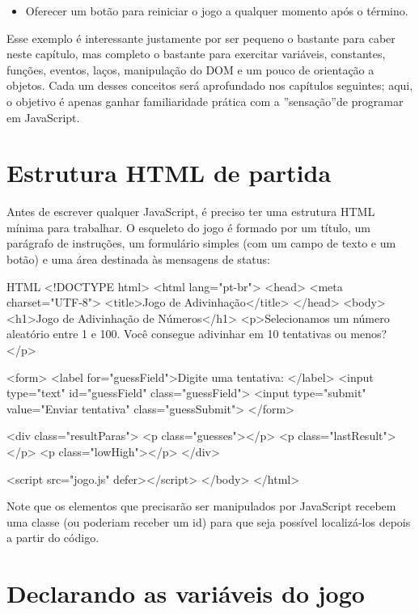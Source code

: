 \begin{itemize}
  \item Oferecer um botão para reiniciar o jogo a qualquer momento após o término.
\end{itemize}

Esse exemplo é interessante justamente por ser pequeno o bastante para caber neste capítulo, mas completo o bastante para exercitar variáveis, constantes, funções, eventos, laços, manipulação do DOM e um pouco de orientação a objetos. Cada um desses conceitos será aprofundado nos capítulos seguintes; aqui, o objetivo é apenas ganhar familiaridade prática com a ”sensação”de programar em JavaScript.

\section{Estrutura HTML de partida}

Antes de escrever qualquer JavaScript, é preciso ter uma estrutura HTML mínima para trabalhar. O esqueleto do jogo é formado por um título, um parágrafo de instruções, um formulário simples (com um campo de texto e um botão) e uma área destinada às mensagens de status:

\begin{codebox}{HTML}
<!DOCTYPE html>
<html lang="pt-br">
<head>
  <meta charset="UTF-8">
  <title>Jogo de Adivinhação</title>
</head>
<body>
  <h1>Jogo de Adivinhação de Números</h1>
  <p>Selecionamos um número aleatório entre 1 e 100.
     Você consegue adivinhar em 10 tentativas ou menos?</p>

     <form>
       <label for="guessField">Digite uma tentativa: </label>
       <input type="text" id="guessField" class="guessField">
       <input type="submit" value="Enviar tentativa" class="guessSubmit">
     </form>

     <div class="resultParas">
       <p class="guesses"></p>
       <p class="lastResult"></p>
       <p class="lowHigh"></p>
     </div>

  <script src="jogo.js" defer></script>
</body>
</html>
\end{codebox}

Note que os elementos que precisarão ser manipulados por JavaScript recebem uma classe (ou poderiam receber um id) para que seja possível localizá-los depois a partir do código.

\section{Declarando as variáveis do jogo}

